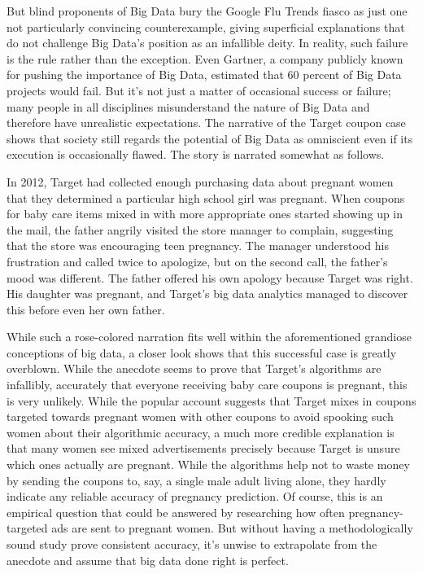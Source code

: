 \documentclass[sigconf]{acmart}
\begin{document}
But blind proponents of Big Data bury the Google Flu Trends fiasco as just one not particularly convincing counterexample, giving superficial explanations that do not challenge Big Data's position as an infallible deity. In reality, such failure is the rule rather than the exception. Even Gartner, a company publicly known for pushing the importance of Big Data, estimated that 60 percent of Big Data projects would fail\cite{Gartner2015}. But it's not just a matter of occasional success or failure; many people in all disciplines misunderstand the nature of Big Data and therefore have unrealistic expectations. The narrative of the Target coupon case shows that society still regards the potential of Big Data as omniscient even if its execution is occasionally flawed. The story is narrated somewhat as follows.

In 2012, Target had collected enough purchasing data about pregnant women that they determined a particular high school girl was pregnant. When coupons for baby care items mixed in with more appropriate ones started showing up in the mail, the father angrily visited the store manager to complain, suggesting that the store was encouraging teen pregnancy. The manager understood his frustration and called twice to apologize, but on the second call, the father's mood was different. The father offered his own apology because Target was right. His daughter was pregnant, and Target's big data analytics managed to discover this before even her own father\cite{Duhigg2012}.

While such a rose-colored narration fits well within the aforementioned grandiose conceptions of big data, a closer look shows that this successful case is greatly overblown. While the anecdote seems to prove that Target's algorithms are infallibly, accurately that everyone receiving baby care coupons is pregnant, this is very unlikely. While the popular account suggests that Target mixes in coupons targeted towards pregnant women with other coupons to avoid spooking such women about their algorithmic accuracy, a much more credible explanation is that many women see mixed advertisements precisely because Target is unsure which ones actually are pregnant\cite{Harford2014}. While the algorithms help not to waste money by sending the coupons to, say, a single male adult living alone, they hardly indicate any reliable accuracy of pregnancy prediction. Of course, this is an empirical question that could be answered by researching how often pregnancy-targeted ads are sent to pregnant women. But without having a methodologically sound study prove consistent accuracy, it's unwise to extrapolate from the anecdote and assume that big data done right is perfect.
\end{document}
